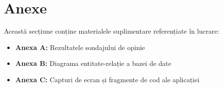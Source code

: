 \documentclass[12pt,a4paper]{report}
\begin{document}
\frontPageRO
\frontPageEN

\begingroup
    \linespread{1}
    \tableofcontents
\endgroup

\AbstractPage

\pagestyle{fancy}












\chapter*{Anexe}
Această secțiune conține materialele suplimentare referențiate în lucrare:

\begin{itemize}
    \item \textbf{Anexa A:} Rezultatele sondajului de opinie
    \item \textbf{Anexa B:} Diagrama entitate-relație a bazei de date
    \item \textbf{Anexa C:} Capturi de ecran și fragmente de cod ale aplicației
\end{itemize}

\begin{appendices}
    
    
    
\end{appendices}
\end{document}
